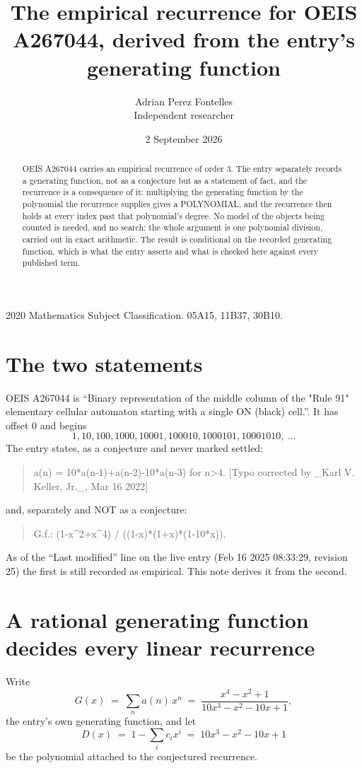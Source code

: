\documentclass[11pt,a4paper]{article}
\title{The empirical recurrence for OEIS A267044, derived from the entry's generating function}
\author{Adrian Perez Fontelles\\ \small Independent researcher}
\date{2 September 2026}
\theoremstyle{plain}
\theoremstyle{definition}
\begin{document}
\maketitle

\begin{abstract}
OEIS A267044 carries an empirical recurrence of order $3$. The entry separately records a
generating function, not as a conjecture but as a statement of fact, and the recurrence is a
consequence of it: multiplying the generating function by the polynomial the recurrence
supplies gives a POLYNOMIAL, and the recurrence then holds at every index past that
polynomial's degree. No model of the objects being counted is needed, and no search: the
whole argument is one polynomial division, carried out in exact arithmetic. The result is
conditional on the recorded generating function, which is what the entry asserts and what is
checked here against every published term.
\end{abstract}

\noindent\small 2020 Mathematics Subject Classification. 05A15, 11B37, 30B10.\normalsize

\section{The two statements}

OEIS A267044 is ``Binary representation of the middle column of the "Rule 91" elementary cellular automaton starting with a single ON (black) cell.''. It has offset $0$ and begins
\[
1, 10, 100, 1000, 10001, 100010, 1000101, 10001010,\ \dots
\]
The entry states, as a conjecture and never marked settled:
\begin{quote}
a(n) = 10*a(n-1)+a(n-2)-10*a(n-3) for n>4. [Typo corrected by \_Karl V. Keller, Jr.\_, Mar 16 2022]
\end{quote}
and, separately and NOT as a conjecture:
\begin{quote}
G.f.: (1-x\^{}2+x\^{}4) / ((1-x)*(1+x)*(1-10*x)).
\end{quote}
As of the ``Last modified'' line on the live entry (Feb 16 2025 08:33:29, revision 25) the first is still
recorded as empirical. This note derives it from the second.

\section{A rational generating function decides every linear recurrence}

Write
\[
G(x)\;=\;\sum_{n}a(n)\,x^{n}\;=\;\frac{x^{4} - x^{2} + 1}{10 x^{3} - x^{2} - 10 x + 1},
\]
the entry's own generating function, and let
\[
D(x)\;=\;1-\sum_i c_i x^{i}\;=\;10 x^{3} - x^{2} - 10 x + 1
\]
be the polynomial attached to the conjectured recurrence.
\end{document}
